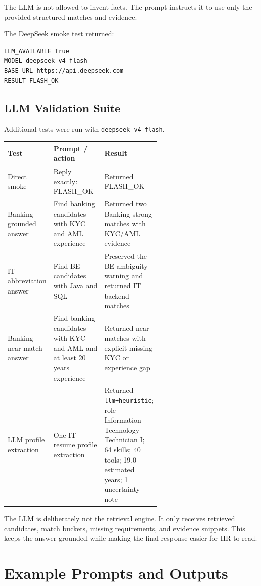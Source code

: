 \documentclass[11pt]{article}
\begin{document}
The LLM is not allowed to invent facts. The prompt instructs it to use only the provided structured matches and evidence.

The DeepSeek smoke test returned:

\begin{lstlisting}
LLM_AVAILABLE True
MODEL deepseek-v4-flash
BASE_URL https://api.deepseek.com
RESULT FLASH_OK
\end{lstlisting}

\subsection{LLM Validation Suite}

Additional tests were run with \texttt{deepseek-v4-flash}.

\begin{center}
\begin{tabularx}{\linewidth}{|p{0.25\linewidth}|p{0.35\linewidth}|Y|}
\hline
\textbf{Test} & \textbf{Prompt / action} & \textbf{Result} \\
\hline
Direct smoke & Reply exactly: FLASH\_OK & Returned FLASH\_OK \\
\hline
Banking grounded answer & Find banking candidates with KYC and AML experience & Returned two Banking strong matches with KYC/AML evidence \\
\hline
IT abbreviation answer & Find BE candidates with Java and SQL & Preserved the BE ambiguity warning and returned IT backend matches \\
\hline
Banking near-match answer & Find banking candidates with KYC and AML and at least 20 years experience & Returned near matches with explicit missing KYC or experience gap \\
\hline
LLM profile extraction & One IT resume profile extraction & Returned \texttt{llm+heuristic}; role Information Technology Technician I; 64 skills; 40 tools; 19.0 estimated years; 1 uncertainty note \\
\hline
\end{tabularx}
\end{center}

The LLM is deliberately not the retrieval engine. It only receives retrieved candidates, match buckets, missing requirements, and evidence snippets. This keeps the answer grounded while making the final response easier for HR to read.

\section{Example Prompts and Outputs}
\end{document}
